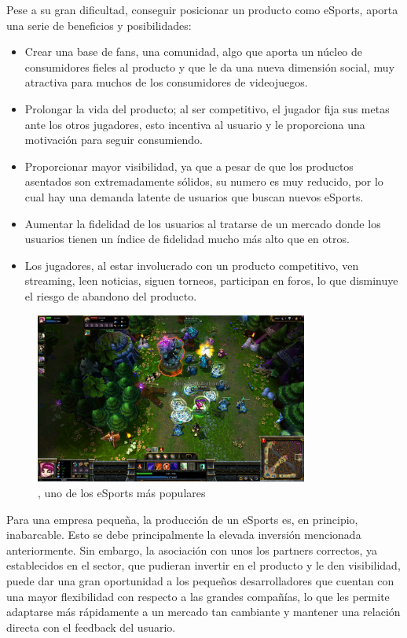 Pese a su gran dificultad, conseguir posicionar un producto como eSports, aporta una serie de beneficios y posibilidades: 
\begin{itemize}
\item Crear una base de fans, una comunidad, algo que aporta un núcleo de consumidores fieles al producto y que le da una nueva dimensión social, muy atractiva para muchos de los consumidores de videojuegos.
\item Prolongar la vida del producto; al ser competitivo, el jugador fija sus metas ante los otros jugadores, esto incentiva al usuario y le proporciona una motivación para seguir consumiendo.
\item Proporcionar mayor visibilidad, ya que a pesar de que los productos asentados son extremadamente sólidos, su numero es muy reducido, por lo cual hay una demanda latente de usuarios que buscan nuevos eSports.
\item Aumentar la fidelidad de los usuarios al tratarse de un mercado donde los usuarios tienen un índice de fidelidad mucho más alto que en otros.
\item Los jugadores, al estar involucrado con un producto competitivo, ven streaming, leen noticias, siguen torneos, participan en foros, lo que disminuye el riesgo de abandono del producto.
\end{itemize}

\begin{figure}[h]
    \centering
    \includegraphics[width=0.8\textwidth]{images/estadodelarte/mercado/foto-lol}
    \caption{, uno de los eSports más populares}
\end{figure}

Para una empresa pequeña, la producción de un eSports es, en principio, inabarcable. Esto se debe principalmente la elevada inversión mencionada anteriormente. Sin embargo, la asociación con unos los partners correctos, ya establecidos en el sector, que pudieran invertir en el producto y le den visibilidad, puede dar una gran oportunidad a los pequeños desarrolladores que cuentan con una mayor flexibilidad con respecto a las grandes compañías, lo que les permite adaptarse más rápidamente a un mercado tan cambiante y mantener una relación directa con el feedback del usuario.

